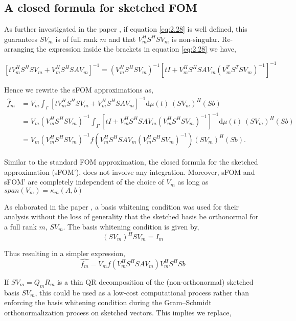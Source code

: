 \subsection{ A closed formula for sketched FOM}
\label{sec_sketched_FOM}

As further investigated in the paper \cite{41}, if equation \ref{eq:2.28} is well defined, this guarantees $SV_m$ is of full rank $m$ and that $V_m^{H}S^{H}SV_m$ is non-singular. Re-arranging the expression inside the brackets in equation \ref{eq:2.28} we have,

\[\left[ t V_m^H S^H S V_m + V_m^H S^H S A V_m \right]^{-1} 
= \left( V_m^H S^H S V_m \right)^{-1} \left[ t I + V_m^H S^H S A V_m \left( V_m^T S^T S V_m \right)^{-1} \right]^{-1}
\]

Hence we rewrite the sFOM approximations as,
\begin{align*}
    \hat{f}_m &= V_m \int_{\Gamma} \left[ tV_m^H S^H S V_m + V_m^H S^H S A V_m \right]^{-1} \mathrm{d}\mu(t) \ (SV_m)^H (Sb) \\
            &= V_m (V_m^H S^H S V_m)^{-1} \int_{\Gamma} \left[ tI + V_m^H S^H S A V_m (V_m^H S^H S V_m)^{-1} \right]^{-1} \mathrm{d}\mu(t) \ (SV_m)^H (Sb) \\
            &= V_m (V_m^H S^H S V_m)^{-1} f \left( V_m^H S^H S A V_m (V_m^H S^H S V_m)^{-1} \right) (SV_m)^H (Sb).
    \tag{\footnotesize sFOM'}
\end{align*}

Similar to the standard FOM approximation, the closed formula for the sketched approximation (sFOM'), does not involve any integration. Moreover, sFOM and sFOM' are completely independent of the choice of $V_m$ as long as $span(V_m) = \kappa_m(A, b)$

As elaborated in the paper \cite{41}, a basis whitening condition was used for their analysis without the loss of generality that the sketched basis be orthonormal for a full rank $m$, $SV_m$. The basis whitening condition is given by,
\begin{equation}
    (SV_m)^{H}SV_m = I_m
    \label{eq:2.29}
\end{equation}

Thus resulting in a simpler expression,
\[
    \hat{f_m} = V_mf(V_m^{H}S^{H}SAV_m)V_m^{H}S^{H}Sb
    \tag{\footnotesize sFOM''}
\]

If $SV_m = Q_mR_m$ is a thin QR decomposition of the (non-orthonormal) sketched basis $SV_m$, this could be used as a low-cost computational process rather than enforcing the basis whitening condition during the Gram–Schmidt orthonormalization process on sketched vectors. This implies we replace,

